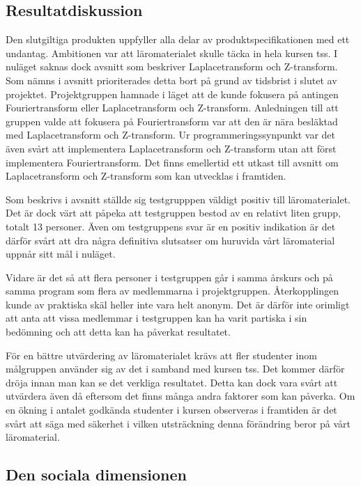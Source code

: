 \documentclass[12pt,a4paper,twoside,openright]{article}
\begin{document}
\subsection{Resultatdiskussion}
\label{sec:resDisk}
Den slutgiltiga produkten uppfyller alla delar av
produktspecifikationen med ett undantag. Ambitionen var att
läromaterialet skulle täcka in hela kursen \gls{tss}. I nuläget saknas
dock avsnitt som beskriver Laplacetransform och Z-transform. Som nämns
i avsnitt  prioriterades detta bort på grund
av tidsbrist i slutet av projektet. Projektgruppen hamnade i läget att
de kunde fokusera på antingen Fouriertransform eller Laplacetransform
och Z-transform. Anledningen till att gruppen valde att fokusera på
Fouriertransform var att den är nära besläktad med Laplacetransform
och Z-transform. Ur programmeringssynpunkt var det även svårt att
implementera Laplacetransform och Z-transform utan att först
implementera Fouriertransform. Det finns emellertid ett utkast till
avsnitt om Laplacetransform och Z-transform som kan utvecklas i
framtiden.

Som beskrivs i avsnitt  ställde sig testgrupppen
väldigt positiv till läromaterialet. Det är dock värt att påpeka att
testgruppen bestod av en relativt liten grupp, totalt 13 personer.
Även om testgruppens svar är en positiv indikation är det därför svårt
att dra några definitiva slutsatser om huruvida vårt läromaterial
uppnår sitt mål i nuläget.

Vidare är det så att flera personer i testgruppen går i samma årskurs
och på samma program som flera av medlemmarna i
projektgruppen. Återkopplingen kunde av praktiska skäl heller inte
vara helt anonym. Det är därför inte orimligt att anta att vissa
medlemmar i testgruppen kan ha varit partiska i sin bedömning och att
detta kan ha påverkat resultatet.

För en bättre utvärdering av läromaterialet krävs att fler studenter
inom målgruppen använder sig av det i samband med kursen
\gls{tss}. Det kommer därför dröja innan man kan se det verkliga
resultatet. Detta kan dock vara svårt att utvärdera även då eftersom
det finns många andra faktorer som kan påverka. Om en ökning i antalet
godkända studenter i kursen observeras i framtiden är det svårt att
säga med säkerhet i vilken utsträckning denna förändring beror på vårt
läromaterial.


\subsection{Den sociala dimensionen}
\end{document}
